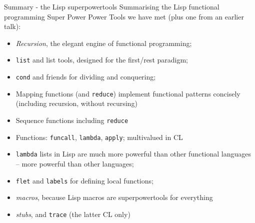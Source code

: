 \documentclass[presentation]{beamer}
\begin{document}
\begin{frame}{Summary - the Lisp superpowertools}
  Summarising the Lisp functional programming Super Power Power Tools we have met (plus one from an earlier talk):
  \begin{itemize}
  \item \emph{Recursion}, the elegant engine of functional programming;
  \item \texttt{list} and list tools, designed for the first/rest paradigm;
  \item \texttt{cond} and friends for dividing and conquering;
  \item Mapping functions (and \texttt{reduce}) implement functional patterns concisely (including recursion, without recursing)
  \item Sequence functions including \texttt{reduce}
  \item Functions: \texttt{funcall}, \texttt{lambda}, \texttt{apply}; multivalued in CL
  \item \texttt{lambda} lists in Lisp are much more powerful than other functional languages -- more powerful than other languages;
  \item \texttt{flet} and \texttt{labels} for defining local functions;
  \item \emph{macros}, because Lisp macros are superpowertools for everything
  \item \emph{stubs}, and \texttt{trace} (the latter CL only)
  \end{itemize}
\end{frame}
\end{document}
